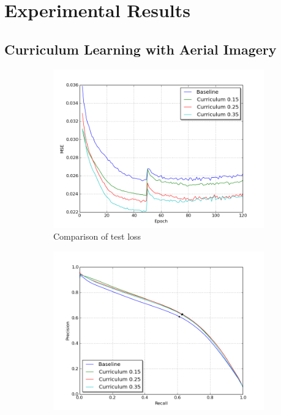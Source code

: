 \section{Experimental Results}
\label{sec:experimentalResults}

\subsection{Curriculum Learning with Aerial Imagery}
\label{sec:results_curriculum_learning_aerial_imagery}

\begin{figure}[!h]
\begin{subfigure}{0.48\textwidth}
\includegraphics[width=\linewidth]{figs/E1/E1-lc.png}
\caption{Comparison of test loss} \label{fig:E1_curr_norway_loss}
\end{subfigure}
\hspace*{\fill} %
\begin{subfigure}{0.48\textwidth}
\includegraphics[width=\linewidth]{figs/E1/E1-pr.png}

\end{subfigure}
\end{figure}
